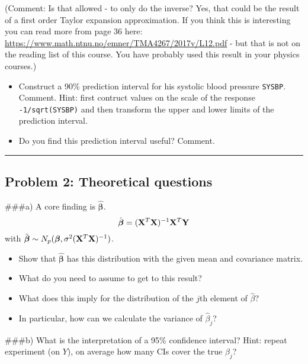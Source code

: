 \documentclass[]{article}
\providecommand{\tightlist}{%
  \setlength{\itemsep}{0pt}\setlength{\parskip}{0pt}}
\begin{document}
(Comment: Is that allowed - to only do the inverse? Yes, that could be
the result of a first order Taylor expansion approximation. If you think
this is interesting you can read more from page 36 here:
\url{https://www.math.ntnu.no/emner/TMA4267/2017v/L12.pdf} - but that is
not on the reading list of this course. You have probably used this
result in your physics courses.)

\begin{itemize}
\tightlist
\item
  Construct a 90\% prediction interval for his systolic blood pressure
  \texttt{SYSBP}. Comment. Hint: first contruct values on the scale of
  the response \texttt{-1/sqrt(SYSBP)} and then transform the upper and
  lower limits of the prediction interval.
\item
  Do you find this prediction interval useful? Comment.
\end{itemize}

\begin{center}\rule{0.5\linewidth}{\linethickness}\end{center}

\hypertarget{problem-2-theoretical-questions}{%
\subsection{Problem 2: Theoretical
questions}\label{problem-2-theoretical-questions}}

\#\#\#a) A core finding is \(\hat{\boldsymbol\beta}\).
\[ \hat{\boldsymbol\beta}=({\bf X}^T{\bf X})^{-1} {\bf X}^T {\bf Y}\]
with
\(\hat{\boldsymbol\beta}\sim N_{p}(\boldsymbol\beta,\sigma^2({\bf X}^T{\bf X})^{-1})\).

\begin{itemize}
\tightlist
\item
  Show that \(\hat{\boldsymbol\beta}\) has this distribution with the
  given mean and covariance matrix.
\item
  What do you need to assume to get to this result?
\item
  What does this imply for the distribution of the \(j\)th element of
  \(\hat{\beta}\)?
\item
  In particular, how can we calculate the variance of \(\hat{\beta}_j\)?
\end{itemize}

\#\#\#b) What is the interpretation of a 95\% confidence interval? Hint:
repeat experiment (on \(Y\)), on average how many CIs cover the true
\(\beta_j\)?
\end{document}
